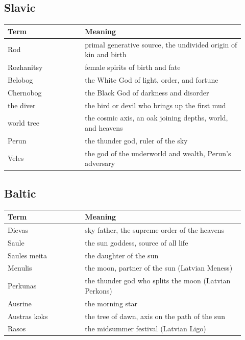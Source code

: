 
\subsection{Slavic}

\begin{longtable}{L{0.30\linewidth} L{0.62\linewidth}}
\toprule
\textbf{Term} & \textbf{Meaning} \\
\midrule
\endhead
Rod & primal generative source, the undivided origin of kin and birth \\
Rozhanitsy & female spirits of birth and fate \\
Belobog & the White God of light, order, and fortune \\
Chernobog & the Black God of darkness and disorder \\
the diver & the bird or devil who brings up the first mud \\
world tree & the cosmic axis, an oak joining depths, world, and heavens \\
Perun & the thunder god, ruler of the sky \\
Veles & the god of the underworld and wealth, Perun's adversary \\
\bottomrule
\end{longtable}

\subsection{Baltic}

\begin{longtable}{L{0.30\linewidth} L{0.62\linewidth}}
\toprule
\textbf{Term} & \textbf{Meaning} \\
\midrule
\endhead
Dievas & sky father, the supreme order of the heavens \\
Saule & the sun goddess, source of all life \\
Saules meita & the daughter of the sun \\
Menulis & the moon, partner of the sun (Latvian Meness) \\
Perkunas & the thunder god who splits the moon (Latvian Perkons) \\
Ausrine & the morning star \\
Austras koks & the tree of dawn, axis on the path of the sun \\
Rasos & the midsummer festival (Latvian Ligo) \\
\bottomrule
\end{longtable}

